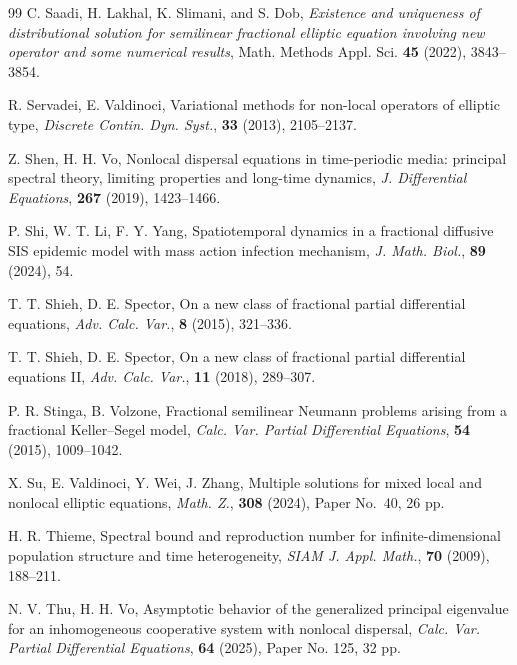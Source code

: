 \documentclass[a4paper,11pt]{amsart}
\theoremstyle{definition}
\numberwithin{equation}{section}
\theoremstyle{definition}
\begin{document}
\begin{thebibliography}{99}
C. Saadi, H. Lakhal, K. Slimani, and S. Dob,
{\it Existence and uniqueness of distributional solution for semilinear fractional elliptic equation involving new operator and some numerical results},
Math. Methods Appl. Sci. {\bf 45} (2022), 3843--3854.

R. Servadei, E. Valdinoci, 
Variational methods for non-local operators of elliptic type, 
\textit{Discrete Contin. Dyn. Syst.}, \textbf{33} (2013), 2105--2137.

Z. Shen, H. H. Vo, 
Nonlocal dispersal equations in time-periodic media: principal spectral theory, limiting properties and long-time dynamics, 
\textit{J. Differential Equations}, \textbf{267} (2019), 1423--1466.


P. Shi, W. T. Li, F. Y. Yang, 
Spatiotemporal dynamics in a fractional diffusive SIS epidemic model with mass action infection mechanism, 
\textit{J. Math. Biol.}, \textbf{89} (2024), 54.

T. T. Shieh, D. E. Spector, 
On a new class of fractional partial differential equations, 
\textit{Adv. Calc. Var.}, \textbf{8} (2015), 321--336.

T. T. Shieh, D. E. Spector, 
On a new class of fractional partial differential equations II, 
\textit{Adv. Calc. Var.}, \textbf{11} (2018), 289--307.

P. R. Stinga, B. Volzone, 
Fractional semilinear Neumann problems arising from a fractional Keller–Segel model, 
\textit{Calc. Var. Partial Differential Equations}, \textbf{54} (2015), 1009--1042.

X. Su, E. Valdinoci, Y. Wei, J. Zhang, 
Multiple solutions for mixed local and nonlocal elliptic equations, 
\textit{Math. Z.}, \textbf{308} (2024), Paper No.~40, 26 pp. 




H. R. Thieme, 
Spectral bound and reproduction number for infinite-dimensional population structure and time heterogeneity, 
\textit{SIAM J. Appl. Math.}, \textbf{70} (2009), 188--211.

N. V. Thu, H. H. Vo, 
Asymptotic behavior of the generalized principal eigenvalue for an inhomogeneous cooperative system with nonlocal dispersal, 
\textit{Calc. Var. Partial Differential Equations}, \textbf{64} (2025), Paper No. 125, 32 pp.


\end{thebibliography}
\end{document}
